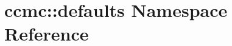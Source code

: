 \hypertarget{namespaceccmc_1_1defaults}{\section{ccmc\-:\-:defaults Namespace Reference}
\label{namespaceccmc_1_1defaults}
}

